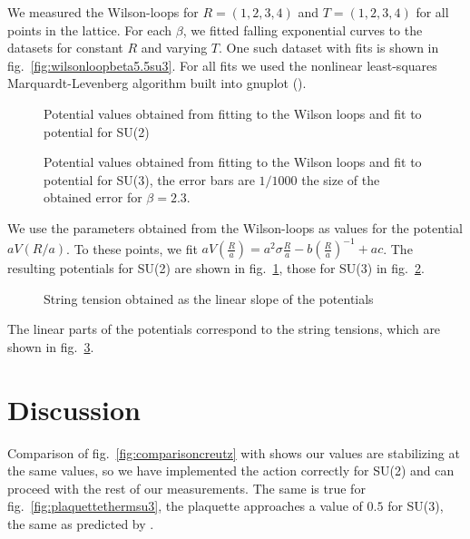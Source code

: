 \documentclass[%
 reprint,
 amsmath,amssymb,
 aps,
]{revtex4-1}
\begin{document}
We measured the Wilson-loops for $R=(1,2,3,4)$ and $T=(1,2,3,4)$ for all points in the lattice. For each $\beta$, we fitted falling exponential curves to the datasets for constant $R$ and varying $T$. One such dataset with fits is shown in fig.~\ref{fig:wilsonloopbeta5.5su3}. For all fits we used the nonlinear least-squares Marquardt-Levenberg algorithm built into gnuplot (\citet{gnuplotdoc}).



\begin{figure}
	\centering
	
	\caption[Potentials obtained using SU(2)]{Potential values obtained from fitting to the Wilson loops and fit to potential for SU(2)}
	\label{fig:fittedpotentialssu2}
\end{figure} 


\begin{figure}
	\centering
	
	\caption[Potentials obtained using SU(3)]{Potential values obtained from fitting to the Wilson loops and fit to potential for SU(3), the error bars are $1/1000$ the size of the obtained error for $\beta=2.3$.}
	\label{fig:fittedpotentialssu3}
\end{figure} 

We use the parameters obtained from the Wilson-loops as values for the potential $aV(R/a)$. To these points, we fit $aV\left(\frac{R}{a}\right)=a^2\sigma \frac{R}{a}-b\left(\frac{R}{a}\right)^{-1}+ac$. The resulting potentials for SU(2) are shown in fig.~\ref{fig:fittedpotentialssu2}, those for SU(3) in fig.~\ref{fig:fittedpotentialssu3}.


\begin{figure}
	\centering
	
	\caption[String tension obtained from potential]{String tension obtained as the linear slope of the potentials}
	\label{fig:stringtension}
\end{figure}

The linear parts of the potentials correspond to the string tensions, which are shown in fig.~\ref{fig:stringtension}.


\section{Discussion}

Comparison of fig.~\ref{fig:comparisoncreutz} with \citet{creutzsu2} shows our values are stabilizing at the same values, so we have implemented the action correctly for SU(2) and can proceed with the rest of our measurements. The same is true for fig.~\ref{fig:plaquettethermsu3}, the plaquette approaches a value of $0.5$ for SU(3), the same as predicted by \citet{lepagelqcd}. 
\end{document}
